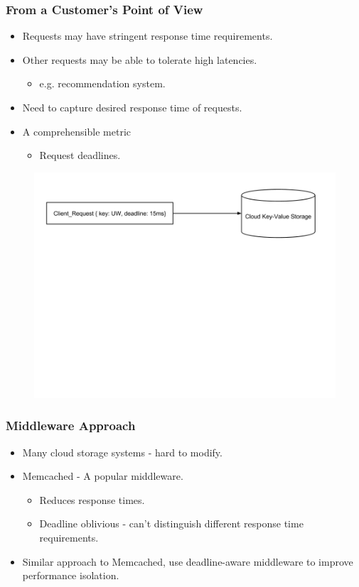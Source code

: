 \documentclass{beamer}
\newcommand{\myv}{\vspace{3 mm}}
\begin{document}
\begin{frame}
  \frametitle{From a Customer's Point of View}
\myv
  \begin{itemize}
  \item Requests may have stringent response time requirements.
    \myv
  \item Other requests may be able to tolerate high latencies.
    \begin{itemize}
    \item e.g. recommendation system.
    \end{itemize}
    \myv
  \item Need to capture desired response time of requests.
    \myv
  \item A comprehensible metric
    \begin{itemize}
    \item Request deadlines.
    \end{itemize}
  \end{itemize}
\vspace{-5 mm}
  \begin{figure}
    \includegraphics[scale=0.35]{img/Request_Deadline_Example.png}
  \end{figure}
\end{frame}

\begin{frame}
  \frametitle{Middleware Approach}
  \begin{itemize}
    \item Many cloud storage systems - hard to modify.
      \myv
    \item Memcached - A popular middleware.
      \begin{itemize}
      \item Reduces response times.
      \item Deadline oblivious - can't distinguish different response time
        requirements.
      \end{itemize}
      \myv
    \item Similar approach to Memcached, use deadline-aware middleware to
      improve performance isolation.
  \end{itemize}

\end{frame}
\end{document}
